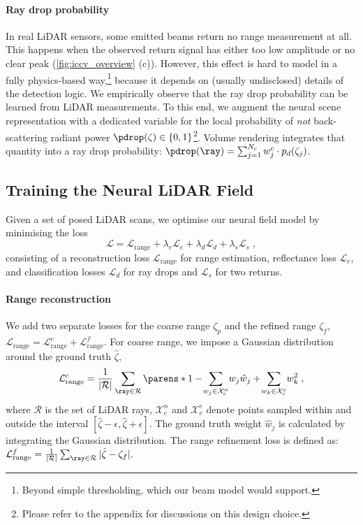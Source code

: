 \paragraph{Ray drop probability}
In real LiDAR sensors, some emitted beams return no range measurement at all. This happens when the observed return signal has either too low amplitude or no clear peak (\cref{fig:iccv_overview} (c)). However, this effect is hard to model in a fully physics-based way,\footnote{Beyond simple thresholding, which our beam model would support.} because it depends on (usually undisclosed) details of the detection logic. We empirically observe that the ray drop probability can be learned from LiDAR measurements. To this end, we augment the neural scene representation with a dedicated variable for the local probability of \textit{not} back-scattering radiant power $\pdrop(\zeta) \in \{0, 1\}$\footnote{Please refer to the appendix for discussions on this design choice.}. 
Volume rendering integrates that quantity into a ray drop probability: $\pdrop(\ray) = \sum_{j=1}^{N_c} w_j^c\cdot p_d(\zeta_j)$.


\subsection{Training the Neural LiDAR Field}
\label{sec:opt}
Given a set of posed LiDAR scans, we optimise our neural field model by minimising the loss
\begin{equation}
    \mathcal{L} = \mathcal{L}_{\text{range}} + \lambda_e \mathcal{L}_{e} + \lambda_d \mathcal{L}_{d} + \lambda_s\mathcal{L}_s\;,
\label{eq:iccv_loss}
\end{equation}
consisting of a reconstruction loss $\mathcal{L}_{\text{range}}$ for range estimation, reflectance loss $\mathcal{L}_{e}$, and classification losses $\mathcal{L}_{d}$ for ray drops and $\mathcal{L}_s$ for two returns. 


\paragraph{Range reconstruction}
We add two separate losses for the coarse range $\zeta_p$ and the refined range $\zeta_f$, $\mathcal{L}_{\text{range}} = \mathcal{L}_{\text{range}}^c + \mathcal{L}_{\text{range}}^f$. For coarse range, we impose a Gaussian distribution~\cite{rematas2021urban} around the ground truth $\hat{\zeta}$, 
\begin{equation}
    \mathcal{L}_{\text{range}}^c = \frac{1}{|\mathcal{R}|} \sum_{\ray \in \mathcal{R}} \parens*{1-\!\sum_{w_j \in \mathcal{X}_c^n}\!w_j \hat{w}_j+\!\sum_{w_k \in \mathcal{X}_c^e}\!w_k^2}\;,
\end{equation}
where $\mathcal{R}$ is the set of LiDAR rays, $\mathcal{X}_c^n$ and $\mathcal{X}_c^e$ denote points sampled within and outside the interval $[\hat{\zeta}-\epsilon,\hat{\zeta}+\epsilon]$. The ground truth weight $\hat{w}_j$ is calculated by integrating the Gaussian distribution.
The range refinement loss is defined as: $\mathcal{L}_{\text{range}}^f = \frac{1}{|\mathcal{R}|} \sum_{\ray \in \mathcal{R}} |\hat{\zeta} - \zeta_f|.$


